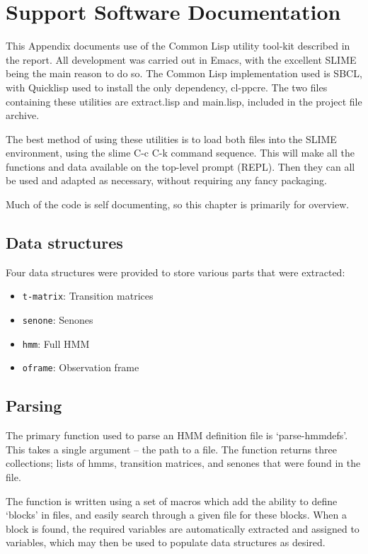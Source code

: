 \chapter{Support Software Documentation} %
\label{apdx:lisp_utils}

This Appendix documents use of the Common Lisp utility tool-kit described in the report.  All development was carried out in Emacs, with the excellent SLIME being the main reason to do so.  The Common Lisp implementation used is SBCL, with Quicklisp used to install the only dependency, cl-ppcre.  The two files containing these utilities are extract.lisp and main.lisp, included in the project file archive.

The best method of using these utilities is to load both files into the SLIME environment, using the slime C-c C-k command sequence.  This will make all the functions and data available on the top-level prompt (REPL).  Then they can all be used and adapted as necessary, without requiring any fancy packaging.

Much of the code is self documenting, so this chapter is primarily for overview.

\section{Data structures} %
\label{apdx:data_structures}
	Four data structures were provided to store various parts that were extracted:
	\begin{itemize}
		\item \texttt{t-matrix}: Transition matrices
		\item \texttt{senone}: Senones
		\item \texttt{hmm}: Full HMM
		\item \texttt{oframe}: Observation frame
	\end{itemize}


\section{Parsing} %
\label{apdx:hmm_parsing}
	The primary function used to parse an HMM definition file is `parse-hmmdefs'.  This takes a single argument -- the path to a file.  The function returns three collections; lists of hmms, transition matrices, and senones that were found in the file.

	The function is written using a set of macros which add the ability to define `blocks' in files, and easily search through a given file for these blocks.  When a block is found, the required variables are automatically extracted and assigned to variables, which may then be used to populate data structures as desired.

